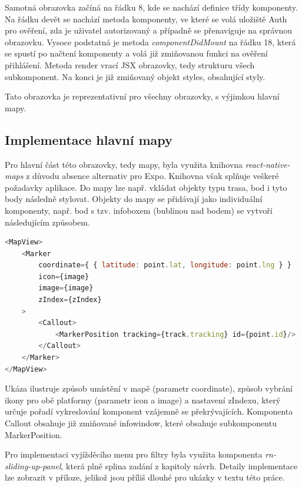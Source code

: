 Samotná obrazovka začíná na řádku 8, kde se nachází definice třídy komponenty. Na řádku devět se nachází metoda komponenty, ve které se volá uložiště Auth pro ověření, zda je uživatel autorizovaný a případně se přenaviguje na správnou obrazovku. Vysoce podstatná je metoda \emph{componentDidMount} na řádku 18, která se spustí po načtení komponenty a volá již zmiňovanou funkci na ověření přihlášení. Metoda render vrací JSX obrazovky, tedy strukturu všech subkomponent. Na konci je již zmiňovaný objekt styles, obsahující styly.

Tato obrazovka je reprezentativní pro všechny obrazovky, s výjimkou hlavní mapy.

\subsection{Implementace hlavní mapy}

Pro hlavní část této obrazovky, tedy mapy, byla využita knihovna \emph{react-native-maps} z důvodu absence alternativ pro Expo. Knihovna však splňuje veškeré požadavky aplikace. Do mapy lze např. vkládat objekty typu trasa, bod i tyto body následně stylovat. Objekty do mapy se přidávají jako individuální komponenty, např. bod s tzv. infoboxem (bublinou nad bodem) se vytvoří následujícím způsobem.

\begin{lstlisting}[language=JavaScript, caption=Ukázka implementace obrazovky]
<MapView>
	<Marker
		coordinate={ { latitude: point.lat, longitude: point.lng } }
		icon={image}
		image={image}
		zIndex={zIndex}
	>
		<Callout>
			<MarkerPosition tracking={track.tracking} id={point.id}/>
		</Callout>
	</Marker>
</MapView>
\end{lstlisting}

Ukáza ilustruje způsob umístění v mapě (parametr coordinate), způsob vybrání ikony pro obě platformy (parametr icon a image) a nastavení zIndexu, který určuje pořadí vykreslování komponent vzájemně se překrývajících. Komponenta Callout obsahuje již zmiňované infowindow, které obsahuje subkomponentu MarkerPosition.

Pro implementaci vyjížděcího menu pro filtry byla využita komponenta \emph{rn-sliding-up-panel}, která plně splina zadání z kapitoly návrh. Detaily implementace lze zobrazit v příloze, jelikož jsou příliš dlouhé pro ukázky v textu této práce.


